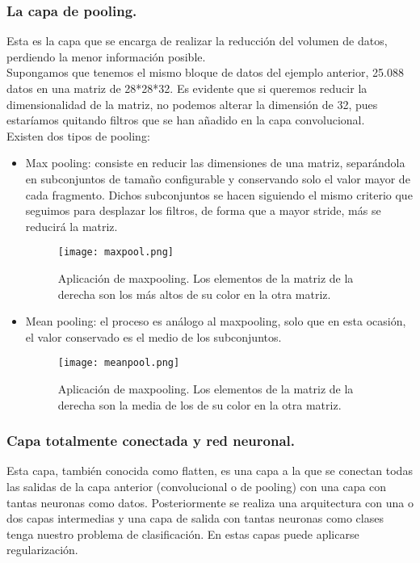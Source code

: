 \documentclass[a4paper,11pt]{article}
\begin{document}
\subsubsection{La capa de pooling.}
Esta es la capa que se encarga de realizar la reducción del volumen de datos, perdiendo la menor información posible.\\ Supongamos que tenemos el mismo bloque de datos del ejemplo anterior, 25.088 datos en una matriz de 28*28*32. Es evidente que si queremos reducir la dimensionalidad de la matriz, no podemos alterar la dimensión de 32, pues estaríamos quitando filtros que se han añadido en la capa convolucional.\\

\noindent
Existen dos tipos de pooling:
\begin{itemize}
\item Max pooling: consiste en reducir las dimensiones de una matriz, separándola en subconjuntos de tamaño configurable y conservando solo el valor mayor de cada fragmento. Dichos subconjuntos se hacen siguiendo el mismo criterio que seguimos para desplazar los filtros, de forma que a mayor stride, más se reducirá la matriz.
\begin{figure}[H]
\centering
\texttt{[image: maxpool.png]}
\caption{Aplicación de maxpooling. Los elementos de la matriz de la derecha son los más altos de su color en la otra matriz.}
\end{figure}
\item Mean pooling: el proceso es análogo al maxpooling, solo que en esta ocasión, el valor conservado es el medio de los subconjuntos.
\begin{figure}[H]
\centering
\texttt{[image: meanpool.png]}
\caption{Aplicación de maxpooling. Los elementos de la matriz de la derecha son la media de los de su color en la otra matriz.}
\end{figure}
\end{itemize}

\subsubsection{Capa totalmente conectada y red neuronal.}
Esta capa, también conocida como flatten, es una capa a la que se conectan todas las salidas de la capa anterior (convolucional o de pooling) con una capa con tantas neuronas como datos. Posteriormente se realiza una arquitectura con una o dos capas intermedias y una capa de salida con tantas neuronas como clases tenga nuestro problema de clasificación. En estas capas puede aplicarse regularización.
\end{document}
